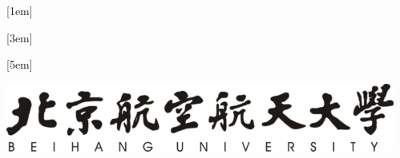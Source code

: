 \documentclass[zihao=-4]{ctexart}
\begin{document}
[1em]{\addvspace{2pt}\filright}
{\contentspush{\thecontentslabel\hspace{0.8em}}}
{}{\contentspage}

[3em]{\addvspace{2pt}\filright}
{\contentspush{\thecontentslabel\hspace{0.8em}}}
{}{\contentspage}

[5em]{\addvspace{2pt}\filright}
{\contentspush{\thecontentslabel\hspace{0.8em}}}
{}{\contentspage}



\linespread{1.8}
\setlength{\parskip}{0.5\baselineskip}





%
%
\def\Fengru{第三十四届“冯如杯”竞赛创意赛道\\}
\vspace{32pt}
\begin{center}
\includegraphics[height=2.25cm, width=12.78cm, scale=1]{include_picture/xiaoming.png}
\end{center}
\vspace{12pt}
\end{document}
